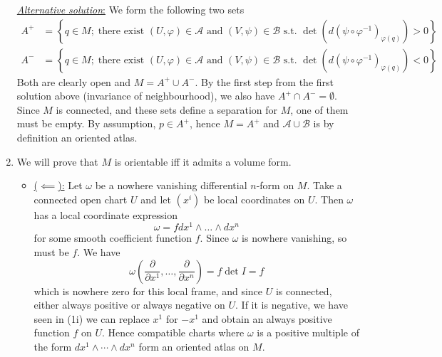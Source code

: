 \documentclass[a4paper, 12pt]{article}
\begin{document}
\begin{Exercise}
\begin{enumerate}[label=(\roman*)]
            \underline{\emph{Alternative solution}:}
            We form the following two sets
            \begin{align*}
                A^+ &= \left\{ q \in M ; \; \text{there exist $(U,\varphi) \in \mathcal{A}$ and $(V,\psi) \in \mathcal{B}$ s.t. $\det(d(\psi\circ\varphi^{-1})_{\varphi(q)}) > 0$} \right\} \\
                A^- &= \left\{ q \in M ; \; \text{there exist $(U,\varphi) \in \mathcal{A}$ and $(V,\psi) \in \mathcal{B}$ s.t. $\det(d(\psi\circ\varphi^{-1})_{\varphi(q)}) < 0$} \right\}
            \end{align*}
            Both are clearly open and $M = A^+ \cup A^-$.
            By the first step from the first solution above (invariance of neighbourhood),
            we also have $A^+ \cap A^- = \emptyset$.
            Since $M$ is connected, and these sets define a separation for $M$,
            one of them must be empty.
            By assumption, $p \in A^+$, hence $M = A^+$ and $\mathcal{A} \cup \mathcal{B}$ is by definition an oriented atlas.
        \item We will prove that $M$ is orientable iff it admits a volume form.
            \begin{itemize}
                \item \underline{($\impliedby$):}
                    Let $\omega$ be a nowhere vanishing differential $n$-form on $M$.
                    Take a connected open chart $U$ and let $(x^i)$ be local coordinates on $U$.
                    Then $\omega$ has a local coordinate expression
                    \[
                        \omega = f dx^1 \wedge \dots \wedge dx^n
                    \]
                    for some smooth coefficient function $f$.
                    Since $\omega$ is nowhere vanishing, so must be $f$.
                    We have
                    \[
                        \omega(\frac{\partial}{\partial x^1},\dots,\frac{\partial}{\partial x^n})
                        = f \det I
                        = f
                    \]
                    which is nowhere zero for this local frame, and since $U$ is connected, either always positive or always negative on $U$.
                    If it is negative, we have seen in (1i) we can replace $x^1$ for $-x^1$ and obtain an always positive function $f$ on $U$.
                    Hence compatible charts where $\omega$ is a positive multiple of the form $dx^1\wedge\cdots\wedge dx^n$ form an oriented atlas on $M$.

\end{itemize}
\end{enumerate}
\end{Exercise}
\end{document}
